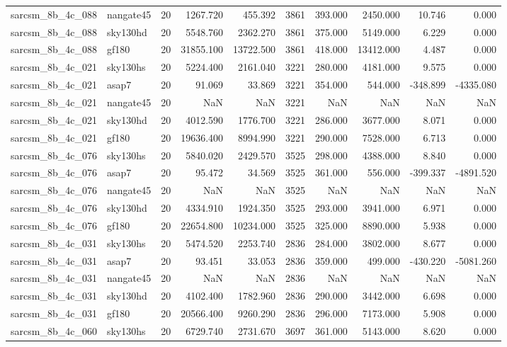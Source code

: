 \begin{tabular}{llrrrrrrrr}
sarcsm\_8b\_4c\_088 & nangate45 & 20 & 1267.720 & 455.392 & 3861 & 393.000 & 2450.000 & 10.746 & 0.000 \\
sarcsm\_8b\_4c\_088 & sky130hd & 20 & 5548.760 & 2362.270 & 3861 & 375.000 & 5149.000 & 6.229 & 0.000 \\
sarcsm\_8b\_4c\_088 & gf180 & 20 & 31855.100 & 13722.500 & 3861 & 418.000 & 13412.000 & 4.487 & 0.000 \\
sarcsm\_8b\_4c\_021 & sky130hs & 20 & 5224.400 & 2161.040 & 3221 & 280.000 & 4181.000 & 9.575 & 0.000 \\
sarcsm\_8b\_4c\_021 & asap7 & 20 & 91.069 & 33.869 & 3221 & 354.000 & 544.000 & -348.899 & -4335.080 \\
sarcsm\_8b\_4c\_021 & nangate45 & 20 & NaN & NaN & 3221 & NaN & NaN & NaN & NaN \\
sarcsm\_8b\_4c\_021 & sky130hd & 20 & 4012.590 & 1776.700 & 3221 & 286.000 & 3677.000 & 8.071 & 0.000 \\
sarcsm\_8b\_4c\_021 & gf180 & 20 & 19636.400 & 8994.990 & 3221 & 290.000 & 7528.000 & 6.713 & 0.000 \\
sarcsm\_8b\_4c\_076 & sky130hs & 20 & 5840.020 & 2429.570 & 3525 & 298.000 & 4388.000 & 8.840 & 0.000 \\
sarcsm\_8b\_4c\_076 & asap7 & 20 & 95.472 & 34.569 & 3525 & 361.000 & 556.000 & -399.337 & -4891.520 \\
sarcsm\_8b\_4c\_076 & nangate45 & 20 & NaN & NaN & 3525 & NaN & NaN & NaN & NaN \\
sarcsm\_8b\_4c\_076 & sky130hd & 20 & 4334.910 & 1924.350 & 3525 & 293.000 & 3941.000 & 6.971 & 0.000 \\
sarcsm\_8b\_4c\_076 & gf180 & 20 & 22654.800 & 10234.000 & 3525 & 325.000 & 8890.000 & 5.938 & 0.000 \\
sarcsm\_8b\_4c\_031 & sky130hs & 20 & 5474.520 & 2253.740 & 2836 & 284.000 & 3802.000 & 8.677 & 0.000 \\
sarcsm\_8b\_4c\_031 & asap7 & 20 & 93.451 & 33.053 & 2836 & 359.000 & 499.000 & -430.220 & -5081.260 \\
sarcsm\_8b\_4c\_031 & nangate45 & 20 & NaN & NaN & 2836 & NaN & NaN & NaN & NaN \\
sarcsm\_8b\_4c\_031 & sky130hd & 20 & 4102.400 & 1782.960 & 2836 & 290.000 & 3442.000 & 6.698 & 0.000 \\
sarcsm\_8b\_4c\_031 & gf180 & 20 & 20566.400 & 9260.290 & 2836 & 296.000 & 7173.000 & 5.908 & 0.000 \\
sarcsm\_8b\_4c\_060 & sky130hs & 20 & 6729.740 & 2731.670 & 3697 & 361.000 & 5143.000 & 8.620 & 0.000 \\

\end{tabular}

